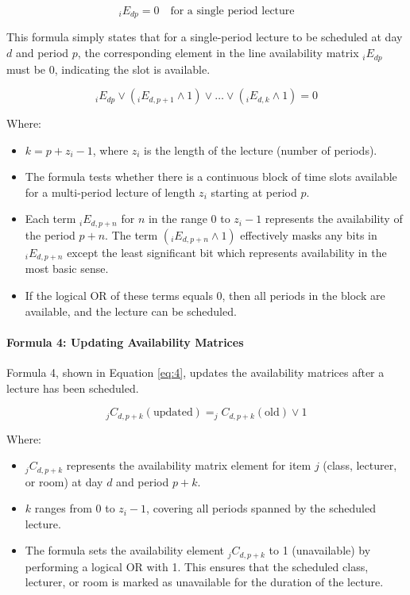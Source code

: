 \begin{equation}
\label{eq:2}
_iE_{dp} = 0 \quad \text{for a single period lecture}
\end{equation}

This formula simply states that for a single-period lecture to be scheduled at day \( d \) and period \( p \), the corresponding element in the line availability matrix \( _iE_{dp} \) must be 0, indicating the slot is available.

\begin{equation}
\label{eq:3}
_iE_{dp} \vee (_iE_{d,p+1} \wedge 1) \vee \dots \vee (_iE_{d,k} \wedge 1) = 0
\end{equation}

Where:
\begin{itemize}
    \item \( k = p + z_i - 1 \), where \( z_i \) is the length of the lecture (number of periods).
    \item The formula tests whether there is a continuous block of time slots available for a multi-period lecture of length \( z_i \) starting at period \( p \).
    \item  Each term \( _iE_{d,p+n} \) for \( n \) in the range \( 0 \) to \( z_i-1 \) represents the availability of the period \( p+n \).  The term \(  (_iE_{d,p+n} \wedge 1)  \) effectively masks any bits in  \( _iE_{d,p+n} \) except the least significant bit which represents availability in the most basic sense.
    \item If the logical OR of these terms equals 0, then all periods in the block are available, and the lecture can be scheduled.
\end{itemize}

\paragraph{Formula 4: Updating Availability Matrices}

Formula 4, shown in Equation \ref{eq:4}, updates the availability matrices after a lecture has been scheduled.

\begin{equation}
\label{eq:4}
_jC_{d, p+k} (\text{updated}) = _jC_{d, p+k} (\text{old}) \vee 1
\end{equation}

Where:
\begin{itemize}
    \item \( _jC_{d, p+k} \) represents the availability matrix element for item \( j \) (class, lecturer, or room) at day \( d \) and period \( p+k \).
    \item \( k \) ranges from 0 to \( z_i - 1 \), covering all periods spanned by the scheduled lecture.
    \item The formula sets the availability element \( _jC_{d, p+k} \) to 1 (unavailable) by performing a logical OR with 1.
This ensures that the scheduled class, lecturer, or room is marked as unavailable for the duration of the lecture.
\end{itemize}

